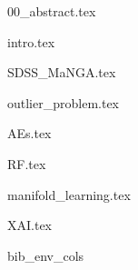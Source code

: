 \documentclass[letterpaper, 12pt]{article}
\begin{document}
  {00_abstract.tex}

  {intro.tex}
  
  {SDSS_MaNGA.tex}
  
  {outlier_problem.tex}
  
  {AEs.tex}

  {RF.tex}

  {manifold_learning.tex}

  {XAI.tex}
  
  \clearpage
  \newpage

  {bib_env_cols}

  \scriptsize
  
\end{document}
